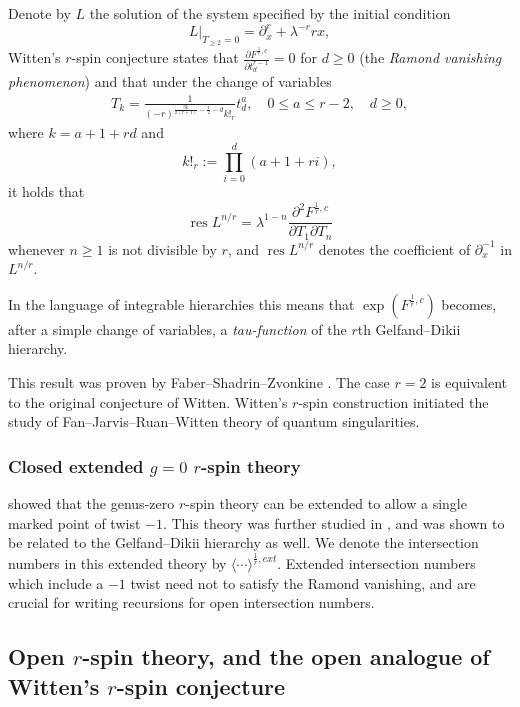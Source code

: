\documentclass[11pt]{amsart}
\theoremstyle{definition}
\theoremstyle{remark}
\newcommand{\<}{\left<}
\renewcommand{\>}{\right>}
\DeclareMathOperator{\res}{res}
\numberwithin{equation}{section}
\begin{document}
Denote by $L$ the solution of the system specified by the initial condition
\begin{equation}\label{eq:init_cond_L}
L|_{T_{\geq 2}=0}=\partial_x^r+\lambda^{-r}rx,
\end{equation}
Witten's $r$-spin conjecture states that $\frac{\partial F^{\frac{1}{r},c}}{\partial t^{r-1}_d}=0$ for $d\geq 0$ (the \emph{Ramond vanishing phenomenon}) and that under the change of variables
\begin{gather}\label{eq:closed r-spin change of variables}
T_k=\frac{1}{(-r)^{\frac{3k}{2(r+1)}-\frac{1}{2}-d}k!_r}t^a_d,\quad 0\le a\le r-2,\quad d\ge 0,
\end{gather}
where $k=a+1+rd$ and
$$
k!_r:=\prod_{i=0}^d(a+1+ri),
$$
it holds that
$$
\res L^{n/r}=\lambda^{1-n}\frac{\partial^2 F^{\frac{1}{r},c}}{\partial T_1\partial T_n}
$$
whenever $n\geq 1$ is not divisible by $r$, and $\res L^{n/r}$ denotes the coefficient of $\partial_x^{-1}$ in $L^{n/r}$.

In the language of integrable hierarchies this means that  $\exp(F^{\frac{1}{r},c})$ becomes, after a simple change of variables, a \emph{tau-function} of the $r$th Gelfand--Dikii hierarchy.  


This result was proven by Faber--Shadrin--Zvonkine \cite{FSZ10}.  The case $r=2$ is equivalent to the original conjecture of Witten. Witten's $r$-spin construction initiated the study of Fan--Jarvis--Ruan--Witten \cite{FJR} theory of quantum singularities.

\subsubsection{Closed extended $g=0$ $r$-spin theory}
\cite{JKV2} showed that the genus-zero $r$-spin theory can be extended to allow a single marked point of twist $-1$. This theory was further studied in \cite{BCT_Closed_Extended}, and was shown to be related to the Gelfand--Dikii hierarchy as well. We denote the intersection numbers in this extended theory by $\langle\cdots\rangle^{\frac{1}{r},ext}.$ Extended intersection numbers which include a $-1$ twist need not to satisfy the Ramond vanishing, and are crucial for writing recursions for open intersection numbers.


\subsection{Open $r$-spin theory, and the open analogue of Witten's $r$-spin conjecture}
\end{document}
